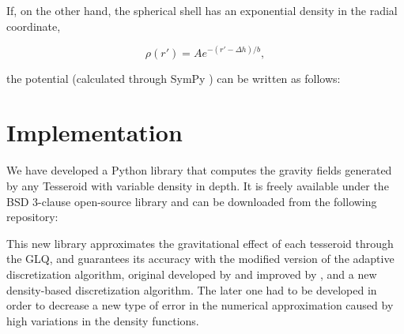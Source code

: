 \documentclass[extra]{gji}
\begin{document}
If, on the other hand, the spherical shell has an exponential density in the radial coordinate,

\begin{equation}
    \rho(r') = Ae^{-(r' - \Delta h)/b},
\end{equation}

\noindent the potential (calculated through SymPy \citep{sympy2017}) can be written as follows:



\section{Implementation}

We have developed a Python library that computes the gravity fields generated by any Tesseroid with variable density in depth.
It is freely available under the BSD 3-clause open-source library and can be downloaded from the following repository: 

This new library approximates the gravitational effect of each tesseroid through the GLQ, and guarantees its accuracy with the modified version of the adaptive discretization algorithm, original developed by \citet{Li2011} and improved by \citet{Uieda2016}, and a new density-based discretization algorithm.
The later one had to be developed in order to decrease a new type of error in the numerical approximation caused by high variations in the density functions.
\end{document}
